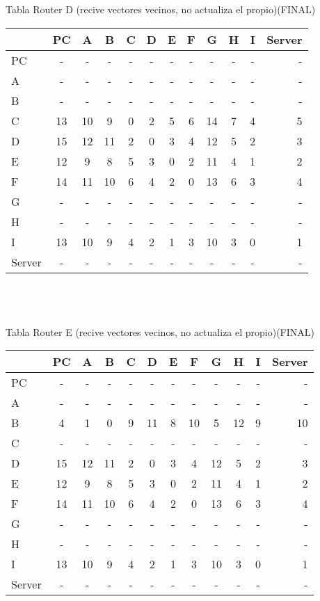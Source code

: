 \documentclass{article}
\begin{document}
\\
\\
Tabla Router D (recive vectores vecinos, no actualiza el propio)(FINAL)	 \\
\begin{tabular}{l*{10}{c}r}
              & PC & A & B & C & D & E & F & G & H & I & Server \\
\hline
PC             & - & - & - & - & - & - & - & - & - & - & -\\
A              & - & - & - & - & - & - & - & - & - & - & -\\
B              & - & - & - & - & - & - & - & - & - & - & -\\
C              & 13 & 10 & 9 & 0 & 2 & 5 & 6 & 14 & 7 & 4 & 5\\
D              & 15 & 12 & 11 & 2 & 0 & 3 & 4 & 12 & 5 & 2 & 3\\
E              & 12 & 9 & 8 & 5 & 3 & 0 & 2 & 11 & 4 & 1 & 2\\
F              & 14 & 11 & 10 & 6 & 4 & 2 & 0 & 13 & 6 & 3 & 4\\
G              & - & - & - & - & - & - & - & - & - & - & -\\
H              & - & - & - & - & - & - & - & - & - & - & -\\
I              & 13 & 10 & 9 & 4 & 2 & 1 & 3 & 10 & 3 & 0 & 1\\
Server         & - & - & - & - & - & - & - & - & - & - & -\\

\end{tabular}\\
\\
\\
Tabla Router E (recive vectores vecinos, no actualiza el propio)(FINAL) \\
\begin{tabular}{l*{10}{c}r}
              & PC & A & B & C & D & E & F & G & H & I & Server \\
\hline
PC             & - & - & - & - & - & - & - & - & - & - & -\\
A              & - & - & - & - & - & - & - & - & - & - & -\\
B              & 4 & 1 & 0 & 9 & 11	& 8 & 10 & 5 & 12 & 9 & 10\\
C              & - & - & - & - & - & - & - & - & - & - & -\\
D              & 15 & 12 & 11 & 2 & 0 & 3 & 4 & 12 & 5 & 2 & 3\\
E              & 12 & 9 & 8 & 5 & 3 & 0 & 2 & 11 & 4 & 1 & 2\\
F              & 14 & 11 & 10 & 6 & 4 & 2 & 0 & 13 & 6 & 3 & 4\\
G              & - & - & - & - & - & - & - & - & - & - & -\\
H              & - & - & - & - & - & - & - & - & - & - & -\\
I              & 13 & 10 & 9 & 4 & 2 & 1 & 3 & 10 & 3 & 0 & 1\\
Server         & - & - & - & - & - & - & - & - & - & - & -\\

\end{tabular}
\end{document}
